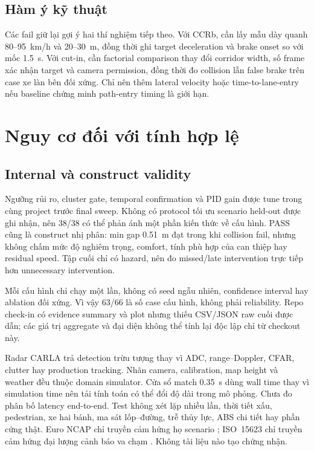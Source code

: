\documentclass[conference]{IEEEtran}
\begin{document}
\subsection{Hàm ý kỹ thuật}
Các fail giữ lại gợi ý hai thí nghiệm tiếp theo. Với CCRb, cần lấy mẫu dày quanh
80--95~km/h và 20--30~m, đồng thời ghi target deceleration và brake onset so với
mốc 1.5~s. Với cut-in, cần factorial comparison thay đổi corridor width, số frame
xác nhận target và camera permission, đồng thời đo collision lẫn false brake trên
case xe làn bên đối xứng. Chỉ nên thêm lateral velocity hoặc time-to-lane-entry
nếu baseline chứng minh path-entry timing là giới hạn.

\section{Nguy cơ đối với tính hợp lệ}
\subsection{Internal và construct validity}
Ngưỡng rủi ro, cluster gate, temporal confirmation và PID gain được tune trong
cùng project trước final sweep. Không có protocol tối ưu scenario held-out được
ghi nhận, nên 38/38 có thể phản ánh một phần kiến thức về cấu hình. PASS cũng là
construct nhị phân: min gap 0.51~m đạt trong khi collision fail, nhưng không chấm
mức độ nghiêm trọng, comfort, tính phù hợp của can thiệp hay residual speed. Tập
cuối chỉ có hazard, nên đo missed/late intervention trực tiếp hơn unnecessary
intervention.

Mỗi cấu hình chỉ chạy một lần, không có seed ngẫu nhiên, confidence interval hay
ablation đối xứng. Vì vậy 63/66 là số case cấu hình, không phải reliability. Repo
check-in có evidence summary và plot nhưng thiếu CSV/JSON raw cuối được dẫn; các
giá trị aggregate và đại diện không thể tính lại độc lập chỉ từ checkout này.

Radar CARLA trả detection trừu tượng thay vì ADC, range--Doppler, CFAR, clutter
hay production tracking. Nhãn camera, calibration, map height và weather đều
thuộc domain simulator. Cửa sổ match 0.35~s dùng wall time thay vì simulation
time nên tải tính toán có thể đổi độ dài trong mô phỏng. Chưa đo phân bố latency
end-to-end. Test không xét lặp nhiều lần, thời tiết xấu, pedestrian, xe hai bánh,
ma sát lốp--đường, trễ thủy lực, ABS chi tiết hay phần cứng thật. Euro NCAP chỉ
truyền cảm hứng họ scenario \cite{euroncap_aeb}; ISO~15623 chỉ truyền cảm hứng
đại lượng cảnh báo va chạm \cite{iso15623}. Không tài liệu nào tạo chứng nhận.
\end{document}
